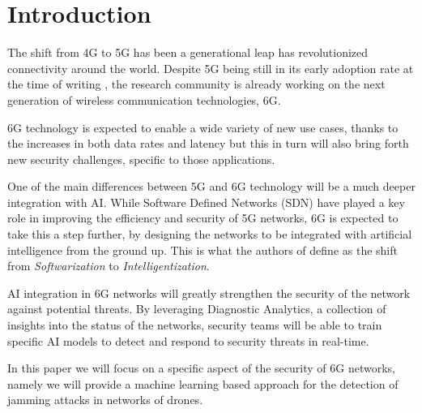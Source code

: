 \documentclass[futureinternet,article,submit,pdftex,moreauthors]{Definitions/mdpi}
\begin{document}
\section{Introduction}

The shift from 4G to 5G has been a generational leap has revolutionized connectivity around the world. 
Despite 5G being still in its early adoption rate at the time of writing \cite{5GStatisticsTaylor}, the research community is already working on the next generation of wireless communication technologies, 6G. 

6G technology is expected to enable a wide variety of new use cases, thanks to the increases in both data rates and latency but this in turn 
will also bring forth new security challenges, specific to those applications. 

One of the main differences between 5G and 6G technology will be a much deeper integration with AI. While Software Defined Networks (SDN) have played a key role in improving the efficiency and security 
of 5G networks, 6G is expected to take this a step further, by designing the networks to be integrated with artificial intelligence from the ground up. This is what the authors of \cite{6GRoadmapLetaief} define as 
the shift from \textit{Softwarization} to \textit{Intelligentization}.

AI integration in 6G networks will greatly strengthen the security of the network against potential threats. 
By leveraging Diagnostic Analytics, a collection of insights into the status of the networks, security teams 
will be able to train specific AI models to detect and respond to security threats in real-time.

In this paper we will focus on a specific aspect of the security of 6G networks, namely we will provide a machine learning based approach 
for the detection of jamming attacks in networks of drones. 
\end{document}
